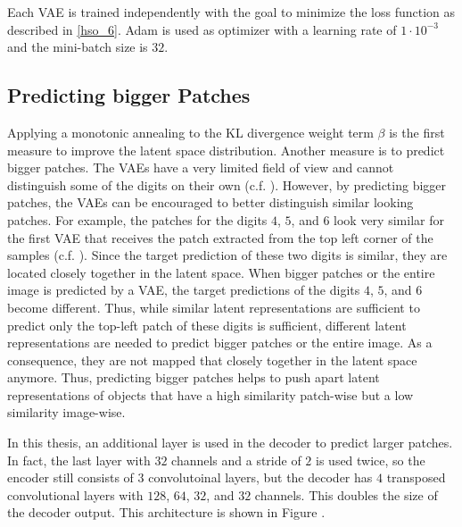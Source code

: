 Each VAE is trained independently with the goal to minimize the loss function as described in \eqref{hso_6}.
Adam  is used as optimizer with a learning rate of $1\cdot 10^{-3}$ and the mini-batch size is $32$.



\subsection{Predicting bigger Patches}
Applying a monotonic annealing to the KL divergence weight term $\beta$ is the first measure to improve the latent space distribution.
Another measure is to predict bigger patches.
The VAEs have a very limited field of view and cannot distinguish some of the digits on their own (c.f. ).
However, by predicting bigger patches, the VAEs can be encouraged to better distinguish similar looking patches.
For example, the patches for the digits $4$, $5$, and $6$ look very similar for the first VAE that receives the patch extracted from the top left corner of the samples (c.f. ).
Since the target prediction of these two digits is similar, they are located closely together in the latent space.
When bigger patches or the entire image is predicted by a VAE, the target predictions of the digits $4$, $5$, and $6$ become different. Thus, while similar latent representations are sufficient to predict only the top-left patch of these digits is sufficient, different latent representations are needed to predict bigger patches or the entire image.
As a consequence, they are not mapped that closely together in the latent space anymore.
Thus, predicting bigger patches helps to push apart latent representations of objects that have a high similarity patch-wise but a low similarity image-wise.

In this thesis, an additional layer is used in the decoder to predict larger patches. In fact, the last layer with $32$ channels and a stride of $2$ is used twice, so the encoder still consists of $3$ convolutoinal layers, but the decoder has $4$ transposed convolutional layers with $128$, $64$, $32$, and $32$ channels. This doubles the size of the decoder output. This architecture is shown in Figure .


